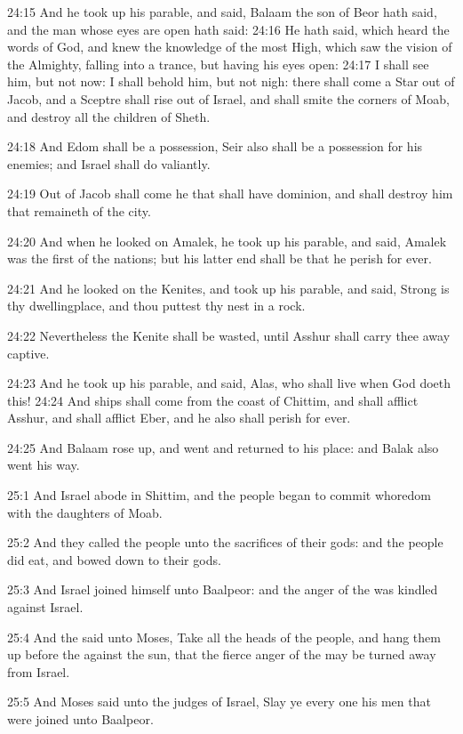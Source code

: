 24:15 And he took up his parable, and said, Balaam the son of Beor hath said, and the man whose eyes are open hath said: 24:16 He hath said, which heard the words of God, and knew the knowledge of the most High, which saw the vision of the Almighty, falling into a trance, but having his eyes open: 24:17 I shall see him, but not now: I shall behold him, but not nigh: there shall come a Star out of Jacob, and a Sceptre shall rise out of Israel, and shall smite the corners of Moab, and destroy all the children of Sheth.

24:18 And Edom shall be a possession, Seir also shall be a possession for his enemies; and Israel shall do valiantly.

24:19 Out of Jacob shall come he that shall have dominion, and shall destroy him that remaineth of the city.

24:20 And when he looked on Amalek, he took up his parable, and said, Amalek was the first of the nations; but his latter end shall be that he perish for ever.

24:21 And he looked on the Kenites, and took up his parable, and said, Strong is thy dwellingplace, and thou puttest thy nest in a rock.

24:22 Nevertheless the Kenite shall be wasted, until Asshur shall carry thee away captive.

24:23 And he took up his parable, and said, Alas, who shall live when God doeth this!  24:24 And ships shall come from the coast of Chittim, and shall afflict Asshur, and shall afflict Eber, and he also shall perish for ever.

24:25 And Balaam rose up, and went and returned to his place: and Balak also went his way.

25:1 And Israel abode in Shittim, and the people began to commit whoredom with the daughters of Moab.

25:2 And they called the people unto the sacrifices of their gods: and the people did eat, and bowed down to their gods.

25:3 And Israel joined himself unto Baalpeor: and the anger of the \LORD was kindled against Israel.

25:4 And the \LORD said unto Moses, Take all the heads of the people, and hang them up before the \LORD against the sun, that the fierce anger of the \LORD may be turned away from Israel.

25:5 And Moses said unto the judges of Israel, Slay ye every one his men that were joined unto Baalpeor.

